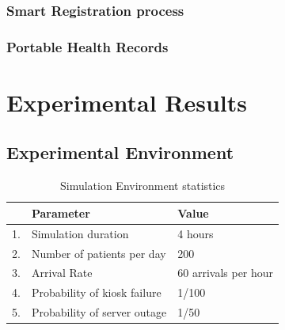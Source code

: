 \documentclass[12pt,a4paper]{report}
\begin{document}
\subsection{Smart Registration process}

\subsection{Portable Health Records}

\chapter{Experimental Results}

\section{Experimental Environment}

\begin{table}[h]
\centering
\caption{Simulation Environment statistics}
\label{my-label}
\begin{tabular}{|l|l|l|}
\hline
                &Parameter     & Value                \\ \hline
1.   & Simulation duration   & 4 hours                  \\ \hline
2.   & Number of patients per day   &200                  \\ \hline
3.   & Arrival Rate   &60 arrivals per hour                 \\ \hline
4.   & Probability of kiosk failure       & 1/100       \\ \hline
5.   & Probability of server outage       & 1/50                \\ \hline

\end{tabular}
\end{table}
\end{document}
